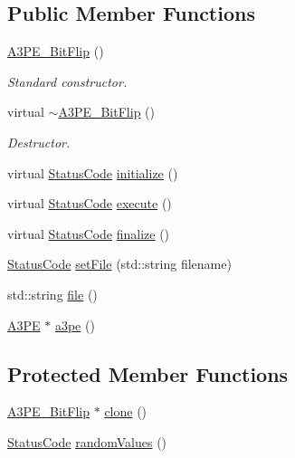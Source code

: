 \subsection*{Public Member Functions}
\begin{DoxyCompactItemize}
\item 
\hyperlink{classA3PE__BitFlip_a79aca0cefbd433bfb7f0e0cb6bc7abe1}{A3\+P\+E\+\_\+\+Bit\+Flip} ()
\begin{DoxyCompactList}\small\item\em Standard constructor. \end{DoxyCompactList}\item 
virtual \hyperlink{classA3PE__BitFlip_ab58f69a2c8d342bcad937b1dbc0bb3ed}{$\sim$\+A3\+P\+E\+\_\+\+Bit\+Flip} ()
\begin{DoxyCompactList}\small\item\em Destructor. \end{DoxyCompactList}\item 
virtual \hyperlink{classStatusCode}{Status\+Code} \hyperlink{classA3PE__BitFlip_a88dc6cfe690a518e38ff6d89026e6e0c}{initialize} ()
\item 
virtual \hyperlink{classStatusCode}{Status\+Code} \hyperlink{classA3PE__BitFlip_affa7320fb39001a6e9b5696542fe4584}{execute} ()
\item 
virtual \hyperlink{classStatusCode}{Status\+Code} \hyperlink{classA3PE__BitFlip_ab40772a001613a0e1932d1e356ccf717}{finalize} ()
\item 
\hyperlink{classStatusCode}{Status\+Code} \hyperlink{classA3PE__BitFlip_a079d34acd89f699395a9bbf6b4918205}{set\+File} (std\+::string filename)
\item 
std\+::string \hyperlink{classA3PE__BitFlip_ace874c555080ce6cb68b6bf320977a5a}{file} ()
\item 
\hyperlink{classA3PE}{A3\+PE} $\ast$ \hyperlink{classA3PE__BitFlip_ac0d0747dfdd99084dd5524fea62f11d6}{a3pe} ()
\end{DoxyCompactItemize}
\subsection*{Protected Member Functions}
\begin{DoxyCompactItemize}
\item 
\hyperlink{classA3PE__BitFlip_1_1A3PE__BitFlip}{A3\+P\+E\+\_\+\+Bit\+Flip} $\ast$ \hyperlink{classA3PE__BitFlip_a444f2b4fd5211e457105f13d19795211}{clone} ()
\item 
\hyperlink{classStatusCode}{Status\+Code} \hyperlink{classA3PE__BitFlip_a57e668f5be18f8bc53f5c105735646bf}{random\+Values} ()
\end{DoxyCompactItemize}
